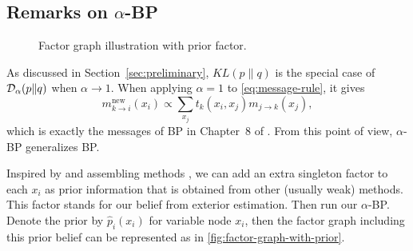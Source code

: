 \documentclass{article}
\begin{document}
\subsection{Remarks on $\alpha$-BP}\label{subsec:remark}
\begin{figure}[!ht]
  \begin{centering}
    \caption{Factor graph illustration with prior factor.}\label{fig:factor-graph-with-prior}
    \vspace{0.1cm}
  \end{centering}
\end{figure}

As discussed in Section~\ref{sec:preliminary}, $KL(p\|q)$ is the special case of $\mathcal{D}_{\alpha}(p\|q)$ when $\alpha \rightarrow 1$. When applying $\alpha=1$ to \autoref{eq:message-rule}, it gives
\begin{equation}
  {m}^{\text{new}}_{k\rightarrow i}(x_i) \propto \sum_{x_j} t_k(x_i, x_j) m_{j \rightarrow k}(x_j),
\end{equation}
which is exactly the messages of BP in Chapter~$8$ of \cite{Bishop:2006:PRM:1162264}. From this point of view, $\alpha$-BP generalizes BP.

Inspired by \cite{pseudo_priorBP2010} and assembling methods \cite{James:2014:ISL:2517747}, we can add an extra singleton factor to each $x_i$ as prior information that is obtained from other (usually weak) methods. This factor stands for our belief from exterior estimation. Then run our $\alpha$-BP. Denote the prior by $\hat{p}_i(x_i)$ for variable node $x_i$, then the factor graph including this prior belief can be represented as in \autoref{fig:factor-graph-with-prior}.
\end{document}

